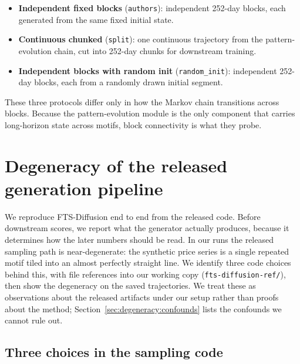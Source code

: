 \documentclass{article}
\begin{document}
\begin{itemize}
  \item \textbf{Independent fixed blocks} (\texttt{authors}): independent 252-day blocks, each generated from the same fixed initial state.
  \item \textbf{Continuous chunked} (\texttt{split}): one continuous trajectory from the pattern-evolution chain, cut into 252-day chunks for downstream training.
  \item \textbf{Independent blocks with random init} (\texttt{random\_init}): independent 252-day blocks, each from a randomly drawn initial segment.
\end{itemize}

These three protocols differ only in how the Markov chain transitions across blocks. Because the pattern-evolution module is the only component that carries long-horizon state across motifs, block connectivity is what they probe.

\section{Degeneracy of the released generation pipeline}
\label{sec:degeneracy}

We reproduce FTS-Diffusion end to end from the released code. Before downstream scores, we report what the generator actually produces, because it determines how the later numbers should be read. In our runs the released sampling path is near-degenerate: the synthetic price series is a single repeated motif tiled into an almost perfectly straight line. We identify three code choices behind this, with file references into our working copy (\texttt{fts-diffusion-ref/}), then show the degeneracy on the saved trajectories. We treat these as observations about the released artifacts under our setup rather than proofs about the method; Section~\ref{sec:degeneracy:confounds} lists the confounds we cannot rule out.

\subsection{Three choices in the sampling code}
\label{sec:degeneracy:choices}
\end{document}
